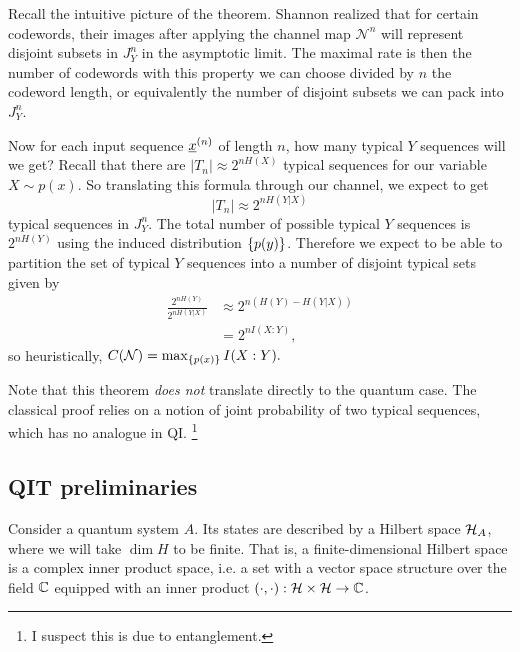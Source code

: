 

Recall the intuitive picture of the theorem. Shannon realized that for certain codewords, their images after applying the channel map $\mathcal{N}^n$ will represent disjoint subsets in $J_Y^n$ in the asymptotic limit. The maximal rate is then the number of codewords with this property we can choose divided by $n$ the codeword length, or equivalently the number of disjoint subsets we can pack into $J_Y^n$.

Now for each input sequence $\underline{x}^{(n)}$ of length $n$, how many typical $Y$ sequences will we get? Recall that there are $|T_n| \approx 2^{nH(X)}$ typical sequences for our variable $X\sim p(x)$. So translating this formula through our channel, we expect to get
\begin{equation}
    |T_n|\approx 2^{nH(Y|X)}
\end{equation}
typical sequences in $J_Y^n$. The total number of possible typical $Y$ sequences is $2^{nH(Y)}$ using the induced distribution $\{p(y)\}$. Therefore we expect to be able to partition the set of typical $Y$ sequences into a number of disjoint typical sets given by
\begin{align}
    \frac{2^{nH(Y)}}{2^{nH(Y|X)}} &\approx 2^{n(H(Y)-H(Y|X))}\\
    &= 2^{nI(X:Y)},
\end{align}
so heuristically, $C(\mathcal{N})=\max_{\{p(x)\}} I(X:Y).$

Note that this theorem \emph{does not} translate directly to the quantum case. The classical proof relies on a notion of joint probability of two typical sequences, which has no analogue in QI.%
    \footnote{I suspect this is due to entanglement.}
    
\subsection*{QIT preliminaries} Consider a quantum system $A$. Its states are described by a Hilbert space $\mathcal H_A$, where we will take $\dim H$ to be finite. That is, a finite-dimensional Hilbert space is a complex inner product space, i.e. a set with a vector space structure over the field $\mathbb{C}$ equipped with an inner product $(\cdot,\cdot):\mathcal H \times \mathcal H \to \mathbb{C}$.

